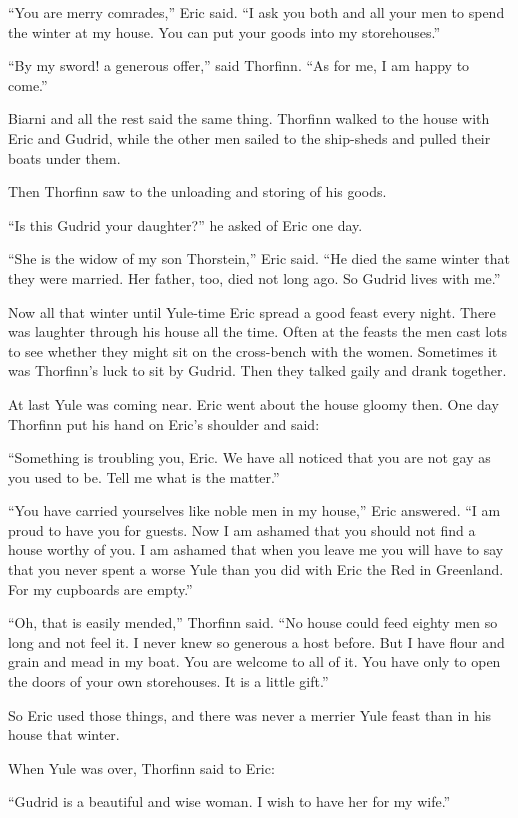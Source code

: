 ``You are merry comrades,'' Eric said. ``I ask you both and all your men
to spend the winter at my house. You can put your goods into my
storehouses.''

``By my sword! a generous offer,'' said Thorfinn. ``As for me, I am
happy to come.''

Biarni and all the rest said the same thing. Thorfinn walked to the
house with Eric and Gudrid, while the other men sailed to the ship-sheds
and pulled their boats under them.

Then Thorfinn saw to the unloading and storing of his goods.

``Is this Gudrid your daughter?'' he asked of Eric one day.

``She is the widow of my son Thorstein,'' Eric said. ``He died the same
winter that they were married. Her father, too, died not long ago. So
Gudrid lives with me.''

Now all that winter until Yule-time Eric spread a good feast every
night. There was laughter through his house all the time. Often at the
feasts the men cast lots to see whether they might sit on the
cross-bench with the women. Sometimes it was Thorfinn's luck to sit by
Gudrid. Then they talked gaily and drank together.

At last Yule was coming near. Eric went about the house gloomy then. One
day Thorfinn put his hand on Eric's shoulder and said:

``Something is troubling you, Eric. We have all noticed that you are not
gay as you used to be. Tell me what is the matter.''

``You have carried yourselves like noble men in my house,'' Eric
answered. ``I am proud to have you for guests. Now I am ashamed that you
should not find a house worthy of you. I am ashamed that when you leave
me you will have to say that you never spent a worse Yule than you did
with Eric the Red in Greenland. For my cupboards are empty.''

``Oh, that is easily mended,'' Thorfinn said. ``No house could feed
eighty men so long and not feel it. I never knew so generous a host
before. But I have flour and grain and mead in my boat. You are welcome
to all of it. You have only to open the doors of your own storehouses.
It is a little gift.''

So Eric used those things, and there was never a merrier Yule feast than
in his house that winter.

When Yule was over, Thorfinn said to Eric:

``Gudrid is a beautiful and wise woman. I wish to have her for my
wife.''

